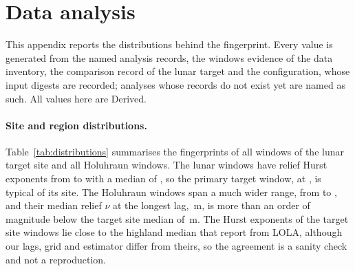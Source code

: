 \section{Data analysis}
\label{sec:appendix-data-analysis}

This appendix reports the distributions behind the fingerprint. Every value is generated from the named analysis records, the windows evidence of the data inventory, the comparison record of the lunar target and the configuration, whose input digests are recorded; analyses whose records do not exist yet are named as such. All values here are Derived.

\paragraph{Site and region distributions.} Table~\ref{tab:distributions} summarises the
fingerprints of all \DistSiteReliefHCount{} windows of the lunar target site and all \DistHoluhraunReliefHCount{}
Holuhraun windows. The lunar windows have relief Hurst exponents from \DistSiteReliefHMin{} to
\DistSiteReliefHMax{} with a median of \DistSiteReliefHMedian, so the primary target window, at
\MoonTargetReliefH, is typical of its site. The Holuhraun windows span a much wider range, from
\DistHoluhraunReliefHMin{} to \DistHoluhraunReliefHMax, and their median relief $\nu$ at the
longest lag, \DistHoluhraunReliefNuLongMedian\,m, is more than an order of magnitude below the
target site median of \DistSiteReliefNuLongMedian\,m. The Hurst exponents of the target site windows lie
close to the highland median that \citet{rosenburg2011} report from LOLA, although our lags,
grid and estimator differ from theirs, so the agreement is a sanity check and not a
reproduction.

